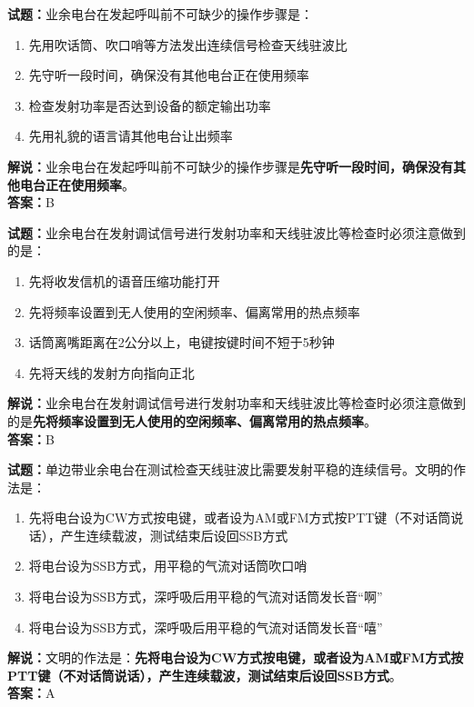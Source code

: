 \documentclass{ctexbook}
\begin{document}
\bigskip


\noindent\textbf{试题：}业余电台在发起呼叫前不可缺少的操作步骤是：
\begin{enumerate}[leftmargin=3em]
\item 先用吹话筒、吹口哨等方法发出连续信号检查天线驻波比
\item 先守听一段时间，确保没有其他电台正在使用频率
\item 检查发射功率是否达到设备的额定输出功率
\item 先用礼貌的语言请其他电台让出频率
\end{enumerate}
\noindent\textbf{解说：}业余电台在发起呼叫前不可缺少的操作步骤是\textbf{先守听一段时间，确保没有其他电台正在使用频率}。\\\noindent\textbf{答案：}B




\bigskip


\noindent\textbf{试题：}业余电台在发射调试信号进行发射功率和天线驻波比等检查时必须注意做到的是：
\begin{enumerate}[leftmargin=3em]
\item 先将收发信机的语音压缩功能打开
\item 先将频率设置到无人使用的空闲频率、偏离常用的热点频率
\item 话筒离嘴距离在2公分以上，电键按键时间不短于5秒钟
\item 先将天线的发射方向指向正北
\end{enumerate}
\noindent\textbf{解说：}业余电台在发射调试信号进行发射功率和天线驻波比等检查时必须注意做到的是\textbf{先将频率设置到无人使用的空闲频率、偏离常用的热点频率}。\\\noindent\textbf{答案：}B



\bigskip


\noindent\textbf{试题：}单边带业余电台在测试检查天线驻波比需要发射平稳的连续信号。文明的作法是：
\begin{enumerate}[leftmargin=3em]
\item 先将电台设为CW方式按电键，或者设为AM或FM方式按PTT键（不对话筒说话），产生连续载波，测试结束后设回SSB方式
\item 将电台设为SSB方式，用平稳的气流对话筒吹口哨
\item 将电台设为SSB方式，深呼吸后用平稳的气流对话筒发长音“啊”
\item 将电台设为SSB方式，深呼吸后用平稳的气流对话筒发长音“嘻”
\end{enumerate}
\noindent\textbf{解说：}文明的作法是：\textbf{先将电台设为CW方式按电键，或者设为AM或FM方式按PTT键（不对话筒说话），产生连续载波，测试结束后设回SSB方式}。\\\noindent\textbf{答案：}A
\end{document}
